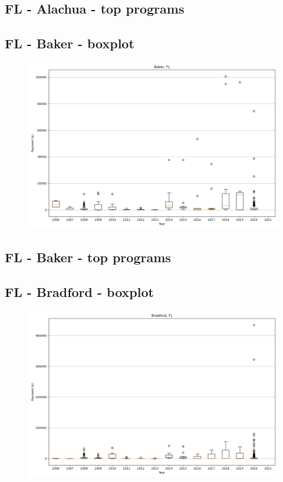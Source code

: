 \subsection*{FL - Alachua - top programs}

\newpage
\subsection*{FL - Baker - boxplot}
\begin{figure}[h]
\centering
\includegraphics[width=7in]{../output/boxplots/counties/Baker-FL_boxplot.png}
\end{figure}


\subsection*{FL - Baker - top programs}

\newpage
\subsection*{FL - Bradford - boxplot}
\begin{figure}[h]
\centering
\includegraphics[width=7in]{../output/boxplots/counties/Bradford-FL_boxplot.png}
\end{figure}



